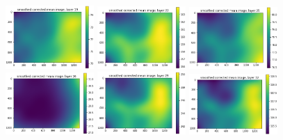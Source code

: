 \documentclass[letterpaper,11pt]{article}
\begin{document}
\begin{figure}[!ht]
\includegraphics[width=0.3\textwidth]{images/results/unmasked_smoothed_corrected_mean_image_layers_vectra/unmasked_smoothed_corrected_mean_image_layer_19}
\includegraphics[width=0.3\textwidth]{images/results/unmasked_smoothed_corrected_mean_image_layers_vectra/unmasked_smoothed_corrected_mean_image_layer_22}
\includegraphics[width=0.3\textwidth]{images/results/unmasked_smoothed_corrected_mean_image_layers_vectra/unmasked_smoothed_corrected_mean_image_layer_25}
\includegraphics[width=0.3\textwidth]{images/results/unmasked_smoothed_corrected_mean_image_layers_vectra/unmasked_smoothed_corrected_mean_image_layer_26}
\includegraphics[width=0.3\textwidth]{images/results/unmasked_smoothed_corrected_mean_image_layers_vectra/unmasked_smoothed_corrected_mean_image_layer_29}
\includegraphics[width=0.3\textwidth]{images/results/unmasked_smoothed_corrected_mean_image_layers_vectra/unmasked_smoothed_corrected_mean_image_layer_32}

\end{figure}
\end{document}
